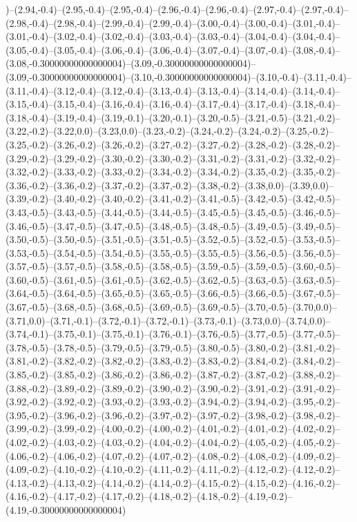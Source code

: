 )--(2.94,-0.4)--(2.95,-0.4)--(2.95,-0.4)--(2.96,-0.4)--(2.96,-0.4)--(2.97,-0.4)--(2.97,-0.4)--(2.98,-0.4)--(2.98,-0.4)--(2.99,-0.4)--(2.99,-0.4)--(3.00,-0.4)--(3.00,-0.4)--(3.01,-0.4)--(3.01,-0.4)--(3.02,-0.4)--(3.02,-0.4)--(3.03,-0.4)--(3.03,-0.4)--(3.04,-0.4)--(3.04,-0.4)--(3.05,-0.4)--(3.05,-0.4)--(3.06,-0.4)--(3.06,-0.4)--(3.07,-0.4)--(3.07,-0.4)--(3.08,-0.4)--(3.08,-0.30000000000000004)--(3.09,-0.30000000000000004)--(3.09,-0.30000000000000004)--(3.10,-0.30000000000000004)--(3.10,-0.4)--(3.11,-0.4)--(3.11,-0.4)--(3.12,-0.4)--(3.12,-0.4)--(3.13,-0.4)--(3.13,-0.4)--(3.14,-0.4)--(3.14,-0.4)--(3.15,-0.4)--(3.15,-0.4)--(3.16,-0.4)--(3.16,-0.4)--(3.17,-0.4)--(3.17,-0.4)--(3.18,-0.4)--(3.18,-0.4)--(3.19,-0.4)--(3.19,-0.1)--(3.20,-0.1)--(3.20,-0.5)--(3.21,-0.5)--(3.21,-0.2)--(3.22,-0.2)--(3.22,0.0)--(3.23,0.0)--(3.23,-0.2)--(3.24,-0.2)--(3.24,-0.2)--(3.25,-0.2)--(3.25,-0.2)--(3.26,-0.2)--(3.26,-0.2)--(3.27,-0.2)--(3.27,-0.2)--(3.28,-0.2)--(3.28,-0.2)--(3.29,-0.2)--(3.29,-0.2)--(3.30,-0.2)--(3.30,-0.2)--(3.31,-0.2)--(3.31,-0.2)--(3.32,-0.2)--(3.32,-0.2)--(3.33,-0.2)--(3.33,-0.2)--(3.34,-0.2)--(3.34,-0.2)--(3.35,-0.2)--(3.35,-0.2)--(3.36,-0.2)--(3.36,-0.2)--(3.37,-0.2)--(3.37,-0.2)--(3.38,-0.2)--(3.38,0.0)--(3.39,0.0)--(3.39,-0.2)--(3.40,-0.2)--(3.40,-0.2)--(3.41,-0.2)--(3.41,-0.5)--(3.42,-0.5)--(3.42,-0.5)--(3.43,-0.5)--(3.43,-0.5)--(3.44,-0.5)--(3.44,-0.5)--(3.45,-0.5)--(3.45,-0.5)--(3.46,-0.5)--(3.46,-0.5)--(3.47,-0.5)--(3.47,-0.5)--(3.48,-0.5)--(3.48,-0.5)--(3.49,-0.5)--(3.49,-0.5)--(3.50,-0.5)--(3.50,-0.5)--(3.51,-0.5)--(3.51,-0.5)--(3.52,-0.5)--(3.52,-0.5)--(3.53,-0.5)--(3.53,-0.5)--(3.54,-0.5)--(3.54,-0.5)--(3.55,-0.5)--(3.55,-0.5)--(3.56,-0.5)--(3.56,-0.5)--(3.57,-0.5)--(3.57,-0.5)--(3.58,-0.5)--(3.58,-0.5)--(3.59,-0.5)--(3.59,-0.5)--(3.60,-0.5)--(3.60,-0.5)--(3.61,-0.5)--(3.61,-0.5)--(3.62,-0.5)--(3.62,-0.5)--(3.63,-0.5)--(3.63,-0.5)--(3.64,-0.5)--(3.64,-0.5)--(3.65,-0.5)--(3.65,-0.5)--(3.66,-0.5)--(3.66,-0.5)--(3.67,-0.5)--(3.67,-0.5)--(3.68,-0.5)--(3.68,-0.5)--(3.69,-0.5)--(3.69,-0.5)--(3.70,-0.5)--(3.70,0.0)--(3.71,0.0)--(3.71,-0.1)--(3.72,-0.1)--(3.72,-0.1)--(3.73,-0.1)--(3.73,0.0)--(3.74,0.0)--(3.74,-0.1)--(3.75,-0.1)--(3.75,-0.1)--(3.76,-0.1)--(3.76,-0.5)--(3.77,-0.5)--(3.77,-0.5)--(3.78,-0.5)--(3.78,-0.5)--(3.79,-0.5)--(3.79,-0.5)--(3.80,-0.5)--(3.80,-0.2)--(3.81,-0.2)--(3.81,-0.2)--(3.82,-0.2)--(3.82,-0.2)--(3.83,-0.2)--(3.83,-0.2)--(3.84,-0.2)--(3.84,-0.2)--(3.85,-0.2)--(3.85,-0.2)--(3.86,-0.2)--(3.86,-0.2)--(3.87,-0.2)--(3.87,-0.2)--(3.88,-0.2)--(3.88,-0.2)--(3.89,-0.2)--(3.89,-0.2)--(3.90,-0.2)--(3.90,-0.2)--(3.91,-0.2)--(3.91,-0.2)--(3.92,-0.2)--(3.92,-0.2)--(3.93,-0.2)--(3.93,-0.2)--(3.94,-0.2)--(3.94,-0.2)--(3.95,-0.2)--(3.95,-0.2)--(3.96,-0.2)--(3.96,-0.2)--(3.97,-0.2)--(3.97,-0.2)--(3.98,-0.2)--(3.98,-0.2)--(3.99,-0.2)--(3.99,-0.2)--(4.00,-0.2)--(4.00,-0.2)--(4.01,-0.2)--(4.01,-0.2)--(4.02,-0.2)--(4.02,-0.2)--(4.03,-0.2)--(4.03,-0.2)--(4.04,-0.2)--(4.04,-0.2)--(4.05,-0.2)--(4.05,-0.2)--(4.06,-0.2)--(4.06,-0.2)--(4.07,-0.2)--(4.07,-0.2)--(4.08,-0.2)--(4.08,-0.2)--(4.09,-0.2)--(4.09,-0.2)--(4.10,-0.2)--(4.10,-0.2)--(4.11,-0.2)--(4.11,-0.2)--(4.12,-0.2)--(4.12,-0.2)--(4.13,-0.2)--(4.13,-0.2)--(4.14,-0.2)--(4.14,-0.2)--(4.15,-0.2)--(4.15,-0.2)--(4.16,-0.2)--(4.16,-0.2)--(4.17,-0.2)--(4.17,-0.2)--(4.18,-0.2)--(4.18,-0.2)--(4.19,-0.2)--(4.19,-0.30000000000000004)